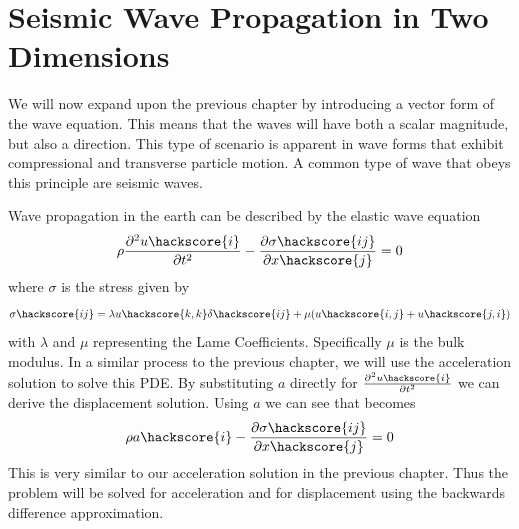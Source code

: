 
%
%
%

\section{Seismic Wave Propagation in Two Dimensions}


We will now expand upon the previous chapter by introducing a vector form of
the wave equation. This means that the waves will have both a scalar magnitude,
but also a direction. This type of scenario is apparent in wave forms that
exhibit compressional and transverse particle motion. A common type of wave
that obeys this principle are seismic waves.

Wave propagation in the earth can be described by the elastic wave equation
\begin{equation} \label{eqn:wav} \index{wave equation}
\rho \frac{\partial^{2}u\hackscore{i}}{\partial t^2} - \frac{\partial
\sigma\hackscore{ij}}{\partial x\hackscore{j}} = 0
\end{equation}
where $\sigma$ is the stress given by
\begin{equation} \label{eqn:sigw}
 \sigma \hackscore{ij} = \lambda u\hackscore{k,k} \delta\hackscore{ij} + \mu (
u\hackscore{i,j} + u\hackscore{j,i})
\end{equation}
with $\lambda$ and $\mu$ representing the Lame Coefficients. Specifically
$\mu$ is the bulk modulus. 
In a similar process to the previous chapter, we will use the acceleration
solution to solve this PDE. By substituting $a$ directly for
$\frac{\partial^{2}u\hackscore{i}}{\partial t^2}$ we can derive the
displacement solution. Using $a$ we can see that  becomes
\begin{equation} \label{eqn:wava} 
\rho a\hackscore{i} - \frac{\partial
\sigma\hackscore{ij}}{\partial x\hackscore{j}} = 0
\end{equation}
This is very similar to our acceleration solution in the previous chapter. Thus
the problem will be solved for acceleration and for displacement using the
backwards difference approximation.

